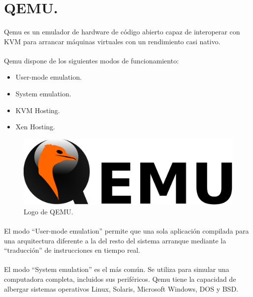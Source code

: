 \section{QEMU.}\label{sec:qemu}

\paragraph{}Qemu es un emulador de hardware de código abierto capaz de interoperar con
\gls{KVM} para arrancar máquinas virtuales con un rendimiento casi nativo.
\cite{qemu}

\paragraph{}Qemu dispone de los siguientes modos de funcionamiento:

\begin{itemize}
	\item User-mode emulation.
	\item System emulation.
	\item \gls{KVM} Hosting.
	\item Xen Hosting.
\end{itemize}

\begin{figure}[h]
	\centering
	\includegraphics[width=0.50\linewidth]{imgs/qemu-logo}
	\caption[Qemu Logo]{Logo de QEMU.}
	\label{fig:qemu}
\end{figure}

\paragraph{} El modo ``User-mode emulation'' permite que una sola aplicación compilada
para una arquitectura diferente a la del resto del sistema arranque mediante la ``traducción''
de instrucciones en tiempo real.

\paragraph{} El modo ``System emulation'' es el más común. Se utiliza para simular una
computadora completa, incluidos sus periféricos. Qemu tiene la capacidad de albergar
sistemas operativos Linux, Solaris, Microsoft Windows, DOS y BSD.

